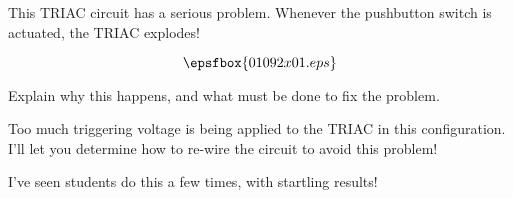 

This TRIAC circuit has a serious problem.  Whenever the pushbutton switch is actuated, the TRIAC explodes!

$$\epsfbox{01092x01.eps}$$

Explain why this happens, and what must be done to fix the problem.







Too much triggering voltage is being applied to the TRIAC in this configuration.  I'll let you determine how to re-wire the circuit to avoid this problem!







I've seen students do this a few times, with startling results!




